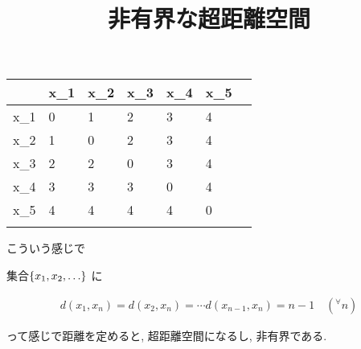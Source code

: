 \documentclass[10pt, fleqn, label-section=none]{bxjsarticle}
\title{非有界な超距離空間}
\date{}
\author{}
\theoremstyle{definition}
\newcommand{\any}{{}^{\forall}}
\newcommand{\cbra}[1]{\mleft\{#1\mright\}}
\renewcommand{\;}{\, ; \,}
\begin{document}
\maketitle

\section{}


\begin{table}[H]
\begin{tabular}{|l|l|l|l|l|l|l|}
\hline
     & x\_1 & x\_2 & x\_3 & x\_4 & x\_5 &  \\ \hline
x\_1 & 0    & 1    & 2    & 3    & 4    &  \\ \hline
x\_2 & 1    & 0    & 2    & 3    & 4    &  \\ \hline
x\_3 & 2    & 2    & 0    & 3    & 4    &  \\ \hline
x\_4 & 3    & 3    & 3    & 0    & 4    &  \\ \hline
x\_5 & 4    & 4    & 4    & 4    & 0    &  \\ \hline
     &      &      &      &      &      &  \\ \hline
\end{tabular}
\end{table}


こういう感じで

集合$\cbra{x_1, x_2, \ldots }$ に

\begin{align*} d(x_1, x_n) = d(x_2, x_n) = \cdots d(x_{n-1}, x_n ) = n-1 \quad (\any n)\end{align*}


って感じで距離を定めると, 超距離空間になるし, 非有界である. 
\end{document}
